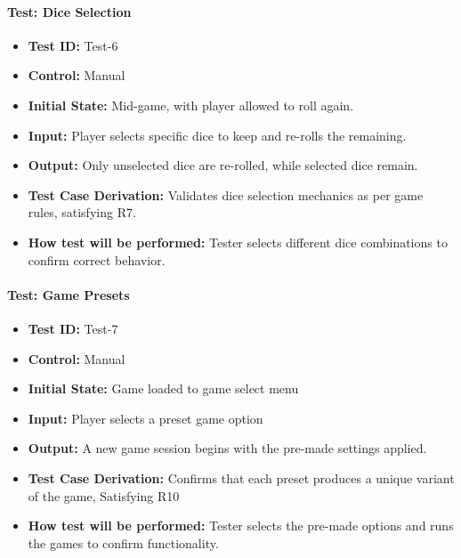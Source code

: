 \documentclass[12pt, titlepage]{article}
\begin{document}
\paragraph{Test: Dice Selection}
\begin{itemize}
    \item \textbf{Test ID:} Test-6
    \item \textbf{Control:} Manual
    \item \textbf{Initial State:} Mid-game, with player allowed to roll again.
    \item \textbf{Input:} Player selects specific dice to keep and re-rolls the remaining.
    \item \textbf{Output:} Only unselected dice are re-rolled, while selected dice remain.
    \item \textbf{Test Case Derivation:} Validates dice selection mechanics as per game rules, satisfying R7.
    \item \textbf{How test will be performed:} Tester selects different dice combinations to confirm correct behavior.
\end{itemize}

\paragraph{Test: Game Presets}
\begin{itemize}
    \item \textbf{Test ID:} Test-7
    \item \textbf{Control:} Manual
    \item \textbf{Initial State:} Game loaded to game select menu
    \item \textbf{Input:} Player selects a preset game option
    \item \textbf{Output:} A new game session begins with the pre-made settings applied.
    \item \textbf{Test Case Derivation:} Confirms that each preset produces a unique variant of the game, Satisfying R10
    \item \textbf{How test will be performed:} Tester selects the pre-made options and runs the games to confirm functionality.
\end{itemize}
\end{document}
